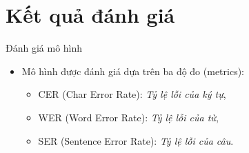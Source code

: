 \documentclass[10pt,a4paper,openany]{beamer}
\begin{document}
	\section{Kết quả đánh giá}
	\begin{frame}{Đánh giá mô hình}
		\begin{itemize}
			\item Mô hình được đánh giá dựa trên ba độ đo (metrics): \newline \pause
			\begin{itemize}
				\item CER (Char Error Rate): \emph{Tỷ lệ lỗi của ký tự}, \newline \pause
				\item WER (Word Error Rate): \emph{Tỷ lệ lỗi của từ}, \newline \pause
				\item SER (Sentence Error Rate): \emph{Tỷ lệ lỗi của câu}.\newline
			\end{itemize}
		\end{itemize}
	\end{frame}
	
	
\end{document}
